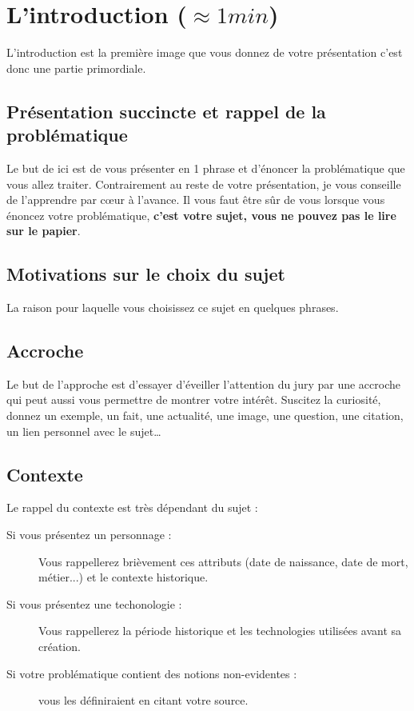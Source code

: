 \section{L'introduction ($\approx 1min$)}

L'introduction est la première image que vous donnez de votre présentation c'est donc une partie primordiale.

\subsection*{Présentation succincte et rappel de la problématique}
Le but de ici est de vous présenter en 1 phrase et d'énoncer la problématique que vous allez traiter.
Contrairement au reste de votre présentation, je vous conseille de l'apprendre par cœur à l'avance. Il vous faut être sûr de vous lorsque vous énoncez votre problématique, \textbf{c'est votre sujet, vous ne pouvez pas le lire sur le papier}.

\subsection*{Motivations sur le choix du sujet}
La raison pour laquelle vous choisissez ce sujet en quelques phrases.

\subsection*{Accroche}
Le but de l'approche est d'essayer d’éveiller l’attention du jury par une accroche qui peut aussi vous permettre de montrer votre intérêt.
Suscitez la curiosité, donnez un exemple, un fait, une actualité, une image, une question, une citation, un lien personnel avec le sujet…

\subsection*{Contexte}
Le rappel du contexte est très dépendant du sujet :
\begin{description}
    \item[Si vous présentez un personnage :] Vous rappellerez brièvement ces attributs (date de naissance, date de mort, métier...) et le contexte historique. 
    \item[Si vous présentez une techonologie :] Vous rappellerez la période historique et les technologies utilisées avant sa création.
    \item[Si votre problématique contient des notions non-evidentes :] vous les définiraient en citant votre source.
\end{description}

